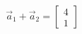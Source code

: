\documentclass[preview]{standalone}
\begin{document}
\begin{align*}
\vec{a}_1+\vec{a}_2=\begin{bmatrix} 4 \\ 1 \end{bmatrix}
\end{align*}
\end{document}

